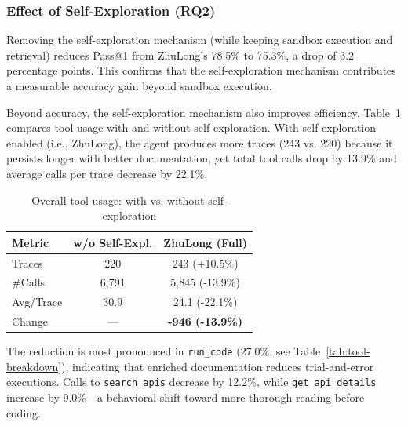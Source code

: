 \subsubsection{Effect of Self-Exploration (RQ2)}

Removing the self-exploration mechanism (while keeping sandbox execution and retrieval) reduces Pass@1 from ZhuLong's 78.5\% to 75.3\%, a drop of 3.2 percentage points. This confirms that the self-exploration mechanism contributes a measurable accuracy gain beyond sandbox execution.

Beyond accuracy, the self-exploration mechanism also improves efficiency. Table~\ref{tab:selfdoc-efficiency} compares tool usage with and without self-exploration. With self-exploration enabled (i.e., ZhuLong), the agent produces more traces (243 vs. 220) because it persists longer with better documentation, yet total tool calls drop by 13.9\% and average calls per trace decrease by 22.1\%.

\begin{table}[htbp]
\centering
\caption{Overall tool usage: with vs. without self-exploration}
\label{tab:selfdoc-efficiency}
\begin{tabular}{lcc}
\toprule
\textbf{Metric} & \textbf{w/o Self-Expl.} & \textbf{ZhuLong (Full)} \\
\midrule
Traces & 220 & 243 (+10.5\%) \\
\#Calls & 6,791 & 5,845 (-13.9\%) \\
Avg/Trace & 30.9 & 24.1 (-22.1\%) \\
\midrule
Change & — & \textbf{-946 (-13.9\%)} \\
\bottomrule
\end{tabular}
\end{table}

The reduction is most pronounced in \texttt{run\_code} (27.0\%, see Table~\ref{tab:tool-breakdown}), indicating that enriched documentation reduces trial-and-error executions. Calls to \texttt{search\_apis} decrease by 12.2\%, while \texttt{get\_api\_details} increase by 9.0\%---a behavioral shift toward more thorough reading before coding.

